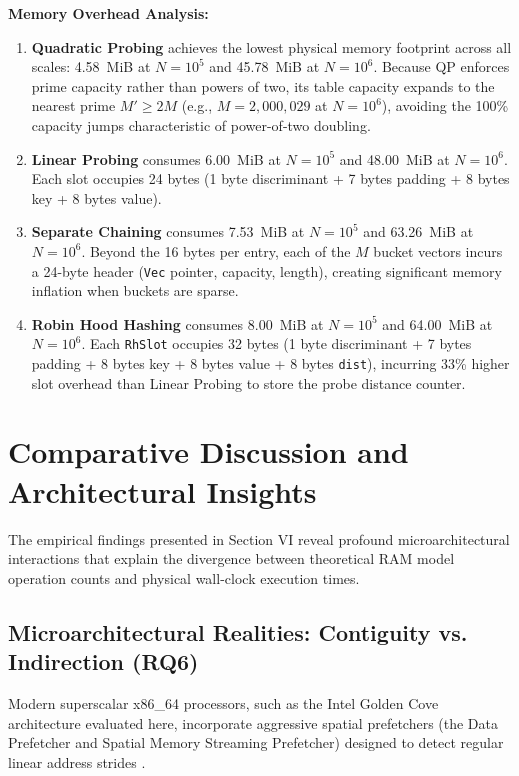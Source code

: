 \documentclass[conference]{IEEEtran}
\begin{document}
\textbf{Memory Overhead Analysis:}
\begin{enumerate}
  \item \textbf{Quadratic Probing} achieves the lowest physical memory footprint across all scales: 4.58~MiB at $N = 10^5$ and 45.78~MiB at $N = 10^6$. Because QP enforces prime capacity rather than powers of two, its table capacity expands to the nearest prime $M' \ge 2 M$ (e.g., $M = 2,000,029$ at $N = 10^6$), avoiding the 100\% capacity jumps characteristic of power-of-two doubling.
  \item \textbf{Linear Probing} consumes 6.00~MiB at $N = 10^5$ and 48.00~MiB at $N = 10^6$. Each slot occupies 24 bytes (1 byte discriminant + 7 bytes padding + 8 bytes key + 8 bytes value).
  \item \textbf{Separate Chaining} consumes 7.53~MiB at $N = 10^5$ and 63.26~MiB at $N = 10^6$. Beyond the 16 bytes per entry, each of the $M$ bucket vectors incurs a 24-byte header (\texttt{Vec} pointer, capacity, length), creating significant memory inflation when buckets are sparse.
  \item \textbf{Robin Hood Hashing} consumes 8.00~MiB at $N = 10^5$ and 64.00~MiB at $N = 10^6$. Each \texttt{RhSlot} occupies 32 bytes (1 byte discriminant + 7 bytes padding + 8 bytes key + 8 bytes value + 8 bytes \texttt{dist}), incurring 33\% higher slot overhead than Linear Probing to store the probe distance counter.
\end{enumerate}

\section{Comparative Discussion and Architectural Insights}

The empirical findings presented in Section VI reveal profound microarchitectural interactions that explain the divergence between theoretical RAM model operation counts and physical wall-clock execution times.

\subsection{Microarchitectural Realities: Contiguity vs. Indirection (RQ6)}

Modern superscalar x86\_64 processors, such as the Intel Golden Cove architecture evaluated here, incorporate aggressive spatial prefetchers (the Data Prefetcher and Spatial Memory Streaming Prefetcher) designed to detect regular linear address strides \cite{fowler2019, richter2015}.
\end{document}

